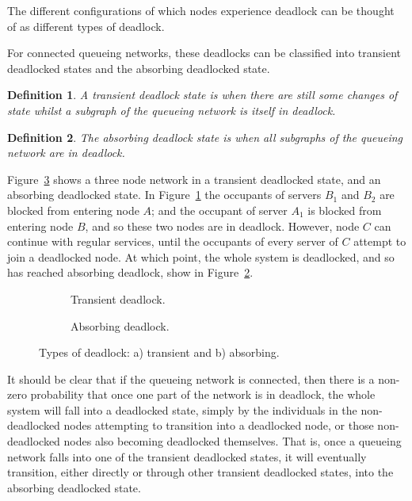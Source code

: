 \documentclass{article}
\newtheorem{definition}{Definition}
\begin{document}
The different configurations of which nodes experience deadlock can be thought
of as different types of deadlock.

For connected queueing networks, these deadlocks can be classified into transient deadlocked states and the absorbing deadlocked state.\\


\begin{definition}
    A transient deadlock state is when there are still some changes of state
    whilst a subgraph of the queueing network is itself in deadlock.\\
\end{definition}

\begin{definition}
    The absorbing deadlock state is when all subgraphs of the
    queueing network are in deadlock.\\
\end{definition}

Figure~\ref{fig:transabsorb} shows a three node network in a transient deadlocked state, and an absorbing deadlocked state.
In Figure~\ref{fig:trans} the occupants of servers $B_1$ and $B_2$ are blocked from entering node $A$; and the occupant of server $A_1$ is blocked from entering node $B$, and so these two nodes are in deadlock.
However, node $C$ can continue with regular services, until the occupants of every server of $C$ attempt to join a deadlocked node.
At which point, the whole system is deadlocked, and so has reached absorbing deadlock, show in Figure~\ref{fig:absorb}.

\begin{figure}[!htbp]
\begin{center}
\begin{subfigure}[b]{0.45\textwidth}
  
  \caption{Transient deadlock.}
  \label{fig:trans}
\end{subfigure}
\begin{subfigure}[b]{0.45\textwidth}
  
  \caption{Absorbing deadlock.}
  \label{fig:absorb}
\end{subfigure}
\caption{Types of deadlock: a) transient and b) absorbing.}
\label{fig:transabsorb}
\end{center}
\end{figure}

It should be clear that if the queueing network is connected, then there is a non-zero probability that once one part of the network is in deadlock, the whole system will fall into a deadlocked state, simply by the individuals in the non-deadlocked nodes attempting to transition into a deadlocked node, or those non-deadlocked nodes also becoming deadlocked themselves.
That is, once a queueing network falls into one of the transient deadlocked states, it will eventually transition, either directly or through other transient deadlocked states, into the absorbing deadlocked state.
\end{document}
